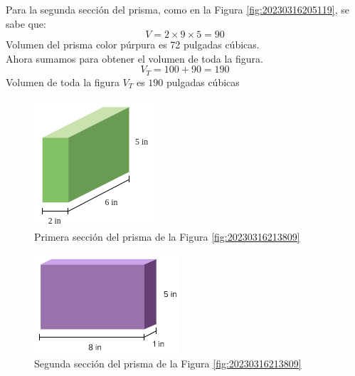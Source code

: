 \begin{solutionbox}{16cm}
\begin{minipage}[t]{.55\textwidth}
        Para la segunda sección del prisma, como en la Figura \ref{fig:20230316205119}, se sabe que:\\
        \[ V = 2\times 9\times 5=90 \]
        Volumen del prisma color púrpura es 72 pulgadas cúbicas.\\
        Ahora sumamos para obtener el volumen de toda la figura.
        \[ V_T = 100+90=190\]
        Volumen de toda la figura $V_T$ es $190$ pulgadas cúbicas
    \end{minipage}
    \begin{multicols}{2}
        \begin{figure}[H]
            \centering
            \includegraphics[width=0.4\linewidth]{../images/20230316213819}
            \caption{Primera sección del prisma de la Figura \ref{fig:20230316213809}}
            \label{fig:20230316213819}
        \end{figure}
        \columnbreak
        \begin{figure}[H]
            \centering
            \includegraphics[width=0.6\linewidth]{../images/20230316213834}
            \caption{Segunda sección del prisma de la Figura \ref{fig:20230316213809}}
            \label{fig:20230316213834}
        \end{figure}
    \end{multicols}
\end{solutionbox}
